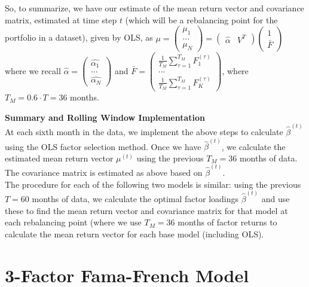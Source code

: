 \documentclass{article}
\begin{document}
So, to summarize, we have our estimate of the mean return vector and covariance matrix, estimated at time step $t$ (which will be a rebalancing point for the portfolio in a dataset), given by OLS, as $\mu = \begin{pmatrix} \mu_1\\
...\\
\mu_N \end{pmatrix} = \begin{pmatrix} \hat{\alpha} & V^T \end{pmatrix} \begin{pmatrix} 1\\
\bar{F} \end{pmatrix}$ where we recall $\hat{\alpha} = \begin{pmatrix} \hat{\alpha_1}\\
...\\
\hat{\alpha_N} \end{pmatrix}$ and $\bar{F} = \begin{pmatrix} \frac{1}{T_M} \sum_{\tau=1}^{T_M} F_1^{(\tau)} \\
...\\
\frac{1}{T_M}\sum_{\tau=1}^{T_M} F_K^{(\tau)} \end{pmatrix}$, where $T_M = 0.6 \cdot T = 36$ months.\\

\vspace{5mm}

\textbf{Summary and Rolling Window Implementation}\\

At each sixth month in the data, we implement the above steps to calculate $\hat{\beta}^{(t)}$ using the OLS factor selection method. Once we have $\hat{\beta}^{(t)}$, we calculate the estimated mean return vector $\mu^{(t)}$ using the previous $T_M=36$ months of data. The covariance matrix is estimated as above based on $\hat{\beta}^{(t)}$.\\

The procedure for each of the following two models is similar: using the previous $T=60$ months of data, we calculate the optimal factor loadings $\hat{\beta}^{(t)}$ and use these to find the mean return vector and covariance matrix for that model at each rebalancing point (where we use $T_M = 36$ months of factor returns to calculate the mean return vector for each base model (including OLS).\\

\break

\section{3-Factor Fama-French Model}
\end{document}
